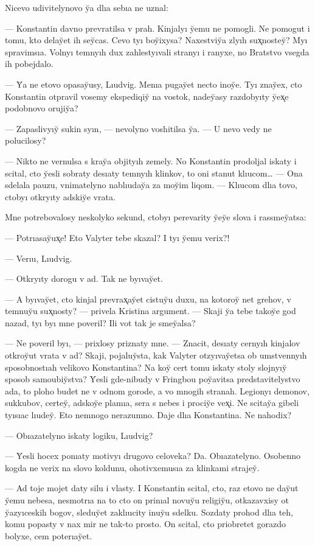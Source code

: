 \documentclass[10pt]{book}
\begin{document}
Nicevo udivitelynovo y̆a dlıa sebıa ne uznal:

— Konstantin davno prevratilsa v prah. Kinjalyı y̆emu ne pomogli. Ne pomogut i tomu, kto delay̆et ih sey̆cas. Cevo tyı boy̆ixysa? Naxestviy̆a zlyıh sux̨nostey̆? Myı spravimsıa. Volnyı temnyıh dux zahlestyıvali stranyı i ranyxe, no Bratstvo vsegda ih pobejdalo.

— Y̆a ne etovo opasay̆usy, Lıudvig. Menıa pugay̆et necto inoy̆e. Tyı znay̆ex, cto Konstantin otpravil vosemy ekspediqiy̆ na vostok, nadey̆asy razdobyıty y̆ex̨e podobnovo orujiy̆a?

— Zapaslivyıy̆ sukin syın, — nevolyno voshitilsa y̆a. — U nevo vedy ne polucilosy?

— Nikto ne vernulsa s kray̆a objityıh zemely. No Konstantin prodoljal iskaty i scital, cto y̆esli sobraty desıaty temnyıh klinkov, to oni stanut klıucom… — Ona sdelala pauzu, vnimatelyno nablıuday̆a za moy̆im liqom. — Klıucom dlıa tovo, ctobyı otkryıty adskiy̆e vrata.

Mne potrebovalosy neskolyko sekund, ctobyı perevarity y̆ey̆e slova i rassmey̆atsa:

— Potrıasay̆ux̨e! Eto Valyter tebe skazal? I tyı y̆emu verix?!

— Verıu, Lıudvig.

— Otkryıty dorogu v ad. Tak ne byıvay̆et.

— A byıvay̆et, cto kinjal prevrax̨ay̆et cistuy̆u duxu, na kotoroy̆ net grehov, v temnuy̆u sux̨nosty? — privela Kristina argument. — Skaji y̆a tebe takoy̆e god nazad, tyı byı mne poveril? Ili vot tak je smey̆alsa?

— Ne poveril byı, — prixlosy priznaty mne. — Znacit, desıaty cernyıh kinjalov otkroy̆ut vrata v ad? Skaji, pojaluy̆sta, kak Valyter otzyıvay̆etsa ob umstvennyıh sposobnostıah velikovo Konstantina? Na koy̆ cert tomu iskaty stoly slojnyıy̆ sposob samoubiy̆stva? Y̆esli gde-nibudy v Fringbou poy̆avitsa predstavitelystvo ada, to ploho budet ne v odnom gorode, a vo mnogih stranah. Legionyı demonov, sukkubov, certey̆, adskoy̆e plamıa, sera s nebes i prociy̆e vex̨i. Ne scitay̆a gibeli tyısıac lıudey̆. Eto nemnogo nerazumno. Daje dlıa Konstantina. Ne nahodix?

— Obıazatelyno iskaty logiku, Lıudvig?

— Y̆esli hocex ponıaty motivyı drugovo celoveka? Da. Obıazatelyno. Osobenno kogda ne verix na slovo koldunu, ohotivxemusıa za klinkami strajey̆.

— Ad toje mojet daty silu i vlasty. I Konstantin scital, cto, raz etovo ne day̆ut y̆emu nebesa, nesmotrıa na to cto on prinıal novuy̆u religiy̆u, otkazavxisy ot y̆azyıceskih bogov, sleduy̆et zaklıucity inuy̆u sdelku. Sozdaty prohod dlıa teh, komu popasty v nax mir ne tak-to prosto. On scital, cto priobretet gorazdo bolyxe, cem poterıay̆et.
\end{document}
